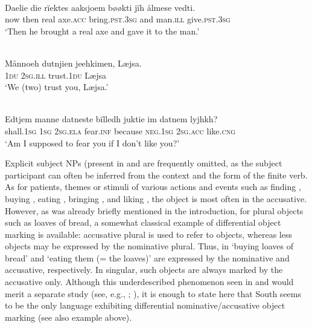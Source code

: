 \documentclass[output=paper]{LSP/langsci}
\begin{document}
\begin{exe}
\ex%
\label{16-ki-ex:5}
\\
\gll Daelie die rïektes aaksjoem bøøkti jïh ålmese vedti.\\
now then real axe.\textsc{acc} bring.\textsc{pst}.\textsc{3sg} and man.\textsc{ill} give.\textsc{pst}.\textsc{3sg}\\
\glt ‘Then he brought a real axe and gave it to the man.’
\end{exe}

\begin{exe}
\ex%
\label{16-ki-ex:6}
\\
\gll Månnoeh dutnjien jeehkimen, Læjsa.\\
\textsc{1du} \textsc{2sg}.\textsc{ill} trust.\textsc{1du} Læjsa\\
\glt  ‘We (two) trust you, Læjsa.’
\end{exe}

\begin{exe}
\ex%
\label{16-ki-ex:7}
\\
\gll Edtjem manne datneste bïlledh juktie im datnem lyjhkh?\\
 shall.\textsc{1sg} \textsc{1sg} \textsc{2sg}.\textsc{ela} fear.\textsc{inf} because \textsc{neg}.\textsc{1sg} \textsc{2sg}.\textsc{acc} like.\textsc{cng}\\
\glt  ‘Am I supposed to fear you if I don’t like you?’ 
\end{exe}

Explicit subject NPs (present in  and  are frequently omitted, as the subject participant can often be inferred from the context and the form of the finite verb. As for patients, themes or stimuli of various actions and events such as finding , buying , eating , bringing , and liking , the object is most often in the accusative. However, as was already briefly mentioned in the introduction, for plural objects such as loaves of bread, a somewhat classical example of differential object marking is available: accusative plural is used to refer to  objects, whereas less  objects may be expressed by the nominative plural. Thus, in  ‘buying loaves of bread’ and ‘eating them (= the loaves)’ are expressed by the nominative and accusative, respectively. In singular, such objects are always marked by the accusative only. Although this underdescribed phenomenon seen in  and  would merit a separate study (see, e.g., \citealt[30–36]{Wickman1955Form}; \citealt[184–186]{Maggaetal2012Sorsamisk}), it is enough to state here that South  seems to be the only  language exhibiting differential nominative/accusative object marking (see also example  above).
\end{document}
